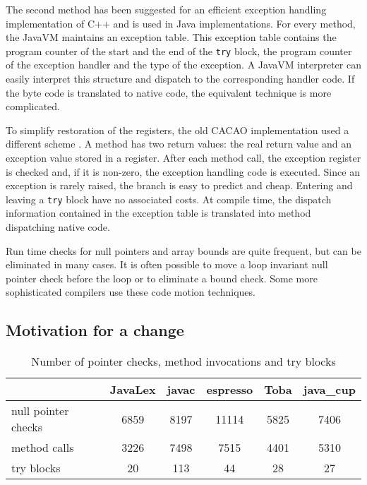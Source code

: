 The second method has been suggested for an efficient exception
handling implementation of C++ \cite{KoenigStroustrup90} and is used
in Java implementations. For every method, the JavaVM maintains an
exception table. This exception table contains the program counter of
the start and the end of the {\tt try} block, the program counter of
the exception handler and the type of the exception. A JavaVM
interpreter can easily interpret this structure and dispatch to the
corresponding handler code. If the byte code is translated to native
code, the equivalent technique is more complicated.

To simplify restoration of the registers, the old CACAO implementation
used a different scheme \cite{KrGr97b}. A method has two return
values: the real return value and an exception value stored in a
register. After each method call, the exception register is checked
and, if it is non-zero, the exception handling code is executed. Since
an exception is rarely raised, the branch is easy to predict and
cheap. Entering and leaving a {\tt try} block have no associated
costs. At compile time, the dispatch information contained in the
exception table is translated into method dispatching native code. 

Run time checks for null pointers and array bounds are quite frequent,
but can be eliminated in many cases. It is often possible to move a
loop invariant null pointer check before the loop or to eliminate a
bound check. Some more sophisticated compilers use these code motion
techniques.


\subsection{Motivation for a change}

\begin{table*}
\begin{center}
\begin{tabular}[b]{|l|c|c|c|c|c|}
\hline 
                    & JavaLex & javac & espresso & Toba & java\_cup \\
\hline
null pointer checks &  6859   &  8197 &  11114   & 5825 &   7406    \\
\hline
method calls        &  3226   &  7498 &   7515   & 4401 &   5310    \\
\hline
try blocks          &    20   &   113 &     44   &   28 &     27    \\
\hline
\end{tabular}
\caption{Number of pointer checks, method invocations and try blocks}
\label{MethodTry}
\end{center}
\end{table*}

